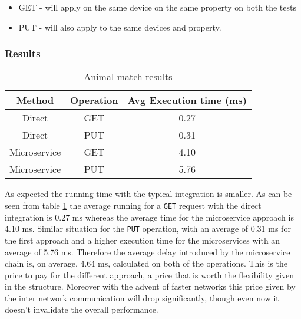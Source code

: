 \begin{itemize}
    \item GET - will apply on the same device on the same property on both the tests
    \item PUT - will also apply to the same devices and property.
\end{itemize}

\subsubsection{Results}

\begin{table}

\centering
\caption{Animal match results}
\label{tab:nestbasic}
\begin{tabular}{|c|c|c|} \hline
\textbf{Method} &  \textbf{Operation} & \textbf{Avg Execution time (ms)} \\ \hline
    Direct & GET & 0.27 \\ \hline
    Direct & PUT & 0.31 \\ \hline
    Microservice & GET & 4.10 \\ \hline
    Microservice & PUT & 5.76 \\ \hline
\end{tabular}
\end{table}

As expected the running time with the typical integration is smaller. As can be seen
from table \ref{tab:nestbasic} the average running for a \texttt{GET} request with the direct integration is 0.27 ms whereas the average time for
the microservice approach is 4.10 ms. Similar situation for the \texttt{PUT} operation, with an average of 0.31 ms for the first approach and a higher
execution time for the microservices with an average of 5.76 ms.
Therefore the average delay introduced by the microservice chain is,
on average, 4.64 ms, calculated on both of the operations. This is the price to pay for the different approach, a price that is worth the flexibility
given in the structure. Moreover with the advent of faster networks this price given by the inter network communication will drop
significantly, though even now it doesn't invalidate the overall performance.

